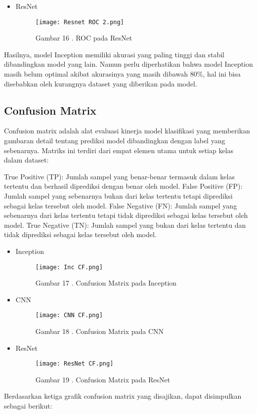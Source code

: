 \documentclass[12pt,a4paper]{article}
\begin{document}
\begin{itemize}
    \item ResNet
    \begin{figure}[H]
        \centering
       \texttt{[image: Resnet ROC 2.png]}
        \caption*{Gambar 16 . ROC  pada ResNet}
        \label{fig:enter-label}
    \end{figure}
\end{itemize}


Hasilnya, model Inception memiliki akurasi yang paling tinggi dan stabil dibandingkan model yang lain. Namun perlu diperhatikan bahwa model Inception masih belum optimal akibat akurasinya yang masih dibawah 80\%, hal ini bisa disebabkan oleh kurangnya dataset yang diberikan pada model. 

\subsection{Confusion Matrix}

Confusion matrix adalah alat evaluasi kinerja model klasifikasi yang memberikan gambaran detail tentang prediksi model dibandingkan dengan label yang sebenarnya. Matriks ini terdiri dari empat elemen utama untuk setiap kelas dalam dataset:

True Positive (TP): Jumlah sampel yang benar-benar termasuk dalam kelas tertentu dan berhasil diprediksi dengan benar oleh model.
False Positive (FP): Jumlah sampel yang sebenarnya bukan dari kelas tertentu tetapi diprediksi sebagai kelas tersebut oleh model.
False Negative (FN): Jumlah sampel yang sebenarnya dari kelas tertentu tetapi tidak diprediksi sebagai kelas tersebut oleh model.
True Negative (TN): Jumlah sampel yang bukan dari kelas tertentu dan tidak diprediksi sebagai kelas tersebut oleh model.
\begin{itemize}
    \item Inception
    \begin{figure}[H]
        \centering
       \texttt{[image: Inc CF.png]}
        \caption*{Gambar 17 . Confusion Matrix  pada Inception}
        \label{fig:enter-label}
    \end{figure}
\end{itemize}
\begin{itemize}
    \item CNN
    \begin{figure}[H]
        \centering
       \texttt{[image: CNN CF.png]}
        \caption*{Gambar 18 . Confusion Matrix pada CNN}
        \label{fig:enter-label}
    \end{figure}
\end{itemize}
\begin{itemize}
    \item ResNet
    \begin{figure}[H]
        \centering
       \texttt{[image: ResNet CF.png]}
        \caption*{Gambar 19 . Confusion Matrix pada ResNet}
        \label{fig:enter-label}
    \end{figure}
\end{itemize}
Berdasarkan ketiga grafik confusion matrix yang disajikan, dapat disimpulkan sebagai berikut:
\end{document}
